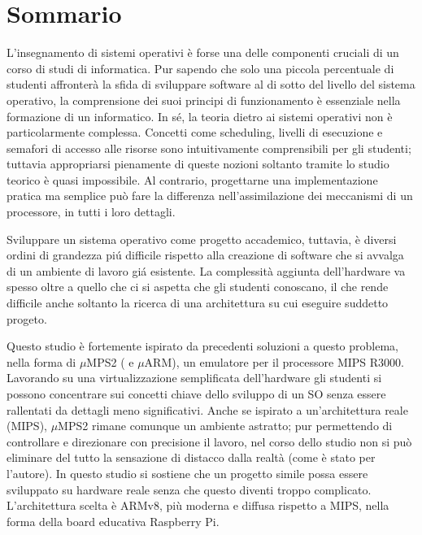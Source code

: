 \documentclass[12pt,a4paper,openright,twoside]{report}
\begin{document}
\clearpage{\pagestyle{empty}\cleardoublepage}%
\chapter*{Sommario}
L'insegnamento di sistemi operativi \`e forse una delle componenti cruciali di un
corso di studi di informatica. Pur sapendo che solo una piccola percentuale di studenti
affronter\`a la sfida di sviluppare software al di sotto del livello del sistema
operativo, la comprensione dei suoi principi di funzionamento \`e essenziale nella
formazione di un informatico. In s\'e, la teoria dietro ai sistemi operativi non 
\`e particolarmente complessa. Concetti come scheduling, livelli di esecuzione e
semafori di accesso alle risorse sono intuitivamente comprensibili per gli studenti;
tuttavia appropriarsi pienamente di queste nozioni soltanto tramite lo studio 
teorico \`e quasi impossibile. Al contrario, progettarne una implementazione
pratica ma semplice pu\`o fare la differenza nell'assimilazione dei meccanismi
di un processore, in tutti i loro dettagli.

Sviluppare un sistema operativo come progetto accademico, tuttavia, \`e diversi
ordini di grandezza pi\'u difficile rispetto alla creazione di software che si 
avvalga di un ambiente di lavoro gi\'a esistente. La complessit\`a aggiunta 
dell'hardware va spesso oltre a quello che ci si aspetta che gli studenti conoscano,
il che rende difficile anche soltanto la ricerca di una architettura su cui
eseguire suddetto progeto.

Questo studio \`e fortemente ispirato da precedenti soluzioni a questo problema,
nella forma di $\mu$MPS2 ( e $\mu$ARM), un emulatore per il processore MIPS R3000.
Lavorando su una virtualizzazione semplificata dell'hardware gli studenti si possono
concentrare sui concetti chiave dello sviluppo di un SO senza essere rallentati
da dettagli meno significativi. Anche se ispirato a un'architettura reale (MIPS),
$\mu$MPS2 rimane comunque un ambiente astratto; pur permettendo di controllare 
e direzionare con precisione il lavoro, nel corso dello studio non si 
pu\`o eliminare del tutto la sensazione di distacco dalla realt\`a (come \`e stato 
per l'autore). In questo studio si sostiene che un progetto simile possa essere
sviluppato su hardware reale senza che questo diventi troppo complicato. L'architettura
scelta \`e ARMv8, pi\`u moderna e diffusa rispetto a MIPS, nella forma della 
board educativa Raspberry Pi.
\end{document}
